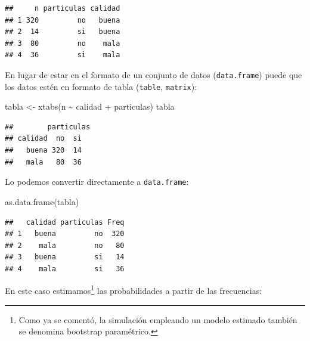 \documentclass[
]{book}
\newenvironment{Shaded}{\begin{snugshade}}{\end{snugshade}}
\newcommand{\FunctionTok}[1]{\textcolor[rgb]{0.00,0.00,0.00}{#1}}
\newcommand{\NormalTok}[1]{#1}
\newcommand{\OtherTok}[1]{\textcolor[rgb]{0.56,0.35,0.01}{#1}}
\newcommand{\SpecialCharTok}[1]{\textcolor[rgb]{0.00,0.00,0.00}{#1}}
\theoremstyle{break}
\theoremstyle{nonumberplain}
\begin{document}
\begin{verbatim}
##     n particulas calidad
## 1 320         no   buena
## 2  14         si   buena
## 3  80         no    mala
## 4  36         si    mala
\end{verbatim}

En lugar de estar en el formato de un conjunto de datos (\texttt{data.frame}) puede que los datos estén en formato de tabla (\texttt{table}, \texttt{matrix}):

\begin{Shaded}
\begin{Highlighting}[]
\NormalTok{tabla }\OtherTok{\textless{}{-}} \FunctionTok{xtabs}\NormalTok{(n }\SpecialCharTok{\textasciitilde{}}\NormalTok{ calidad }\SpecialCharTok{+}\NormalTok{ particulas)}
\NormalTok{tabla}
\end{Highlighting}
\end{Shaded}

\begin{verbatim}
##        particulas
## calidad  no  si
##   buena 320  14
##   mala   80  36
\end{verbatim}

Lo podemos convertir directamente a \texttt{data.frame}:

\begin{Shaded}
\begin{Highlighting}[]
\FunctionTok{as.data.frame}\NormalTok{(tabla)}
\end{Highlighting}
\end{Shaded}

\begin{verbatim}
##   calidad particulas Freq
## 1   buena         no  320
## 2    mala         no   80
## 3   buena         si   14
## 4    mala         si   36
\end{verbatim}

En este caso estimamos\footnote{Como ya se comentó, la simulación empleando un modelo estimado también se denomina bootstrap paramétrico.} las probabilidades a partir de las frecuencias:

\begin{Shaded}
\end{Shaded}
\end{document}
